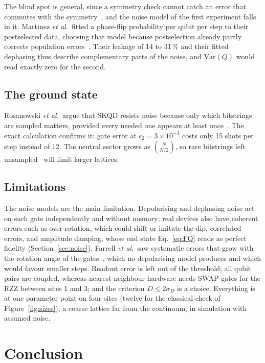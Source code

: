 The blind spot is general, since a symmetry check cannot catch an error that
commutes with the symmetry~\cite{cai2023}, and the noise model of the first
experiment falls in it. Martinez \emph{et al.}\ fitted a phase-flip probability
per qubit per step to their postselected data, choosing that model because
postselection already partly corrects population errors~\cite{martinez2016}.
Their leakage of 14 to 31\,\% and their fitted dephasing thus describe
complementary parts of the noise, and $\mathrm{Var}(Q)$ would read exactly zero
for the second.

\subsection{The ground state}

Rosanowski \emph{et al.}\ argue that SKQD resists noise because only which
bitstrings are sampled matters, provided every needed one appears at least
once~\cite{rosanowski2025}. The exact calculation confirms it: gate error at
$\epsilon_2 = 3\times10^{-3}$ costs only 15 shots per step instead of 12. The
neutral sector grows as $\binom{N}{N/2}$, so rare bitstrings left
unsampled~\cite{miura2026} will limit larger lattices.

\subsection{Limitations}
\label{sec:limitations}

The noise models are the main limitation. Depolarising and dephasing noise act
on each gate independently and without memory; real devices also have coherent
errors such as over-rotation, which could shift or imitate the dip, correlated
errors, and amplitude damping, whose end state Eq.~\eqref{eq:FQ} reads as
perfect fidelity (Section~\ref{sec:noise}). Farrell \emph{et al.}\ saw
systematic errors that grow with the rotation angle of the
gates~\cite{farrell2024b}, which no depolarising model produces and which would
favour smaller steps. Readout error is left out of the threshold; all qubit
pairs are coupled, whereas nearest-neighbour hardware needs SWAP gates for the
RZZ between sites 1 and 3; and the criterion $D \le 2\sigma_D$ is a choice.
Everything is at one parameter point on four sites (twelve for the classical
check of Figure~\ref{fig:sizes}), a coarse lattice far from the continuum, in
simulation with assumed noise.

\section{Conclusion}
\label{sec:conclusion}

